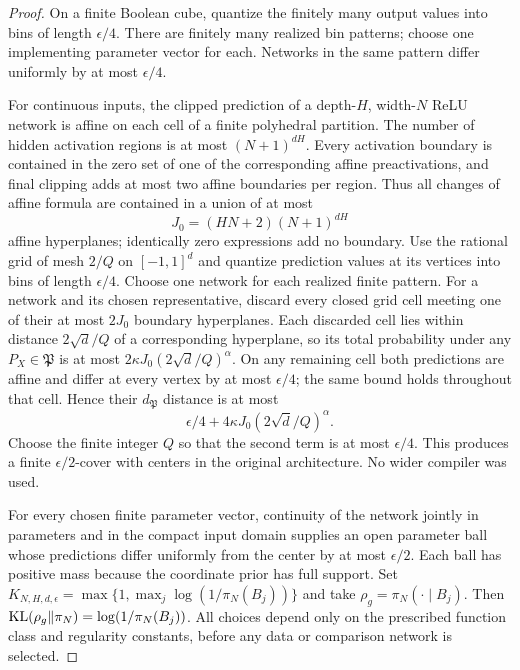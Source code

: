 \begin{proof}
On a finite Boolean cube, quantize the finitely many output values into
bins of length $\epsilon/4$.  There are finitely many realized bin patterns;
choose one implementing parameter vector for each.  Networks in the same
pattern differ uniformly by at most $\epsilon/4$.

For continuous inputs, the clipped prediction of a depth-$H$, width-$N$
ReLU network is affine on each cell of a finite polyhedral partition.
The number of hidden activation regions is at most
$(N+1)^{dH}$.  Every activation boundary is contained in the zero set of
one of the corresponding affine preactivations, and final clipping adds
at most two affine boundaries per region.  Thus all changes of affine
formula are contained in a union of at most
\[
 J_0=(HN+2)(N+1)^{dH}
\]
affine hyperplanes; identically zero expressions add no boundary.
Use the rational grid of mesh $2/Q$ on $[-1,1]^d$ and quantize prediction
values at its vertices into bins of length $\epsilon/4$.
Choose one network for each realized finite pattern.  For a network and
its chosen representative, discard every closed grid cell meeting one
of their at most $2J_0$ boundary hyperplanes.  Each discarded cell lies
within distance $2\sqrt d/Q$ of a corresponding hyperplane, so its total
probability under any $P_X\in\mathfrak P$ is at most
$2\kappa J_0(2\sqrt d/Q)^\alpha$.  On any remaining cell both predictions
are affine and differ at every vertex by at most $\epsilon/4$; the same
bound holds throughout that cell.  Hence their $d_{\mathfrak P}$ distance
is at most
\[
 \epsilon/4+4\kappa J_0(2\sqrt d/Q)^\alpha.
\]
Choose the finite integer $Q$ so that the second term is at most
$\epsilon/4$.  This produces a finite $\epsilon/2$-cover with centers in
the original architecture.  No wider compiler was used.

For every chosen finite parameter vector, continuity of the network
jointly in parameters and in the compact input domain supplies an open
parameter ball whose predictions differ uniformly from the center by
at most $\epsilon/2$.  Each ball has positive mass because the coordinate
prior has full support.  Set
$K_{N,H,d,\epsilon}=\max\{1,\max_j\log(1/\pi_N(B_j))\}$ and take
$\rho_g=\pi_N(\cdot\mid B_j)$.  Then
$\operatorname{KL}(\rho_g\Vert\pi_N)=\log(1/\pi_N(B_j))$.
All choices depend only on the prescribed function class and regularity
constants, before any data or comparison network is selected.
\end{proof}

